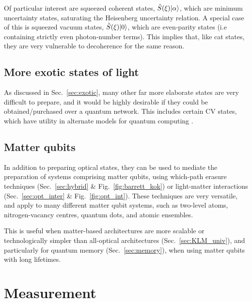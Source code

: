 Of particular interest are squeezed coherent states, $\hat{S}(\xi) |\alpha\rangle$, which are minimum uncertainty states, saturating the Heisenberg uncertainty relation. A special case of this is squeezed vacuum states, $\hat{S}(\xi) |0\rangle$, which are even-parity states (i.e containing strictly even photon-number terms). This implies that, like cat states, they are very vulnerable to decoherence for the same reason.

%
%

\subsection{More exotic states of light}

As discussed in Sec.~\ref{sec:exotic}, many other far more elaborate states are very difficult to prepare, and it would be highly desirable if they could be obtained/purchased over a quantum network. This includes certain CV states, which have utility in alternate models for quantum computing \cite{bib:Menicucci06, Ralph, Lund}.



%
%

\subsection{Matter qubits} 

In addition to preparing optical states, they can be used to mediate the preparation of systems comprising matter qubits, using which-path erasure techniques (Sec.~\ref{sec:hybrid} \& Fig.~\ref{fig:barrett_kok}) or light-matter interactions (Sec.~\ref{sec:opt_inter} \& Fig.~\ref{fig:opt_int}). These techniques are very versatile, and apply to many different matter qubit systems, such as two-level atoms, nitrogen-vacancy centres, quantum dots, and atomic ensembles.

This is useful when matter-based architectures are more scalable or technologically simpler than all-optical architectures (Sec.~\ref{sec:KLM_univ}), and particularly for quantum memory (Sec.~\ref{sec:memory}), when using matter qubits with long lifetimes.

%
%

\section{Measurement} 

